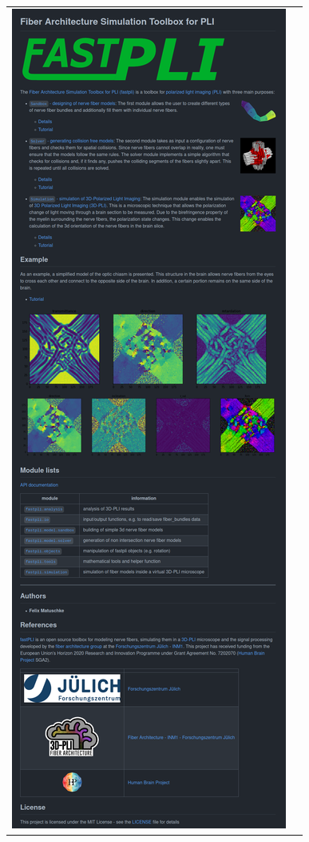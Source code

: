 \begin{figure}[!t]
{{\begin{tabular}{c|c}
 	\includegraphics[valign=T,trim=0 0 0 1580, clip]{gfx/fastpli/fastpli_wiki.png} \\
    \end{tabular}
    }}
	\caption{\dummy{}}
	\label{fig:fastpli_wiki}
\end{figure}
% 
% 

